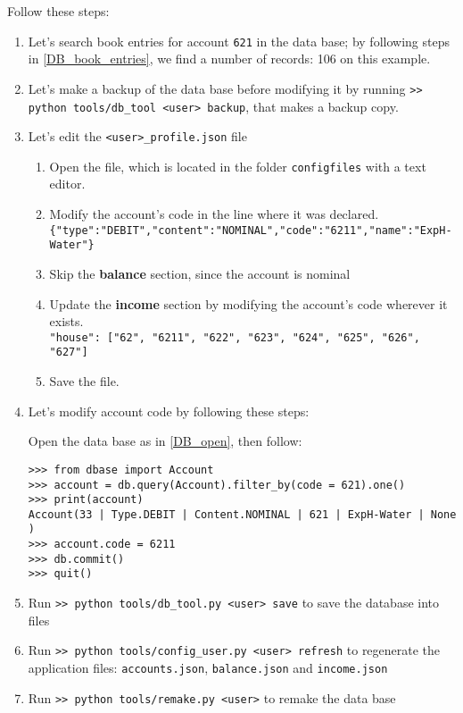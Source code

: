 \documentclass[12pt, a4paper]{article}
\begin{document}
Follow these steps:
\begin{enumerate}
\item Let's search book entries for account \verb!621! in the data base; by following steps in  \ref{DB_book_entries}, we find a number of records:  106 on this example. 
\item Let's make a backup of the data base before modifying it by running 
\verb!>> python tools/db_tool <user> backup!, that makes a backup copy.
\item Let's edit the \verb!<user>_profile.json! file
\begin{enumerate}
 \item Open the file, which is located in the folder \verb!configfiles! with a text editor.
 \item Modify the account's code in the line where it was declared. \\
 \verb!{"type":"DEBIT","content":"NOMINAL","code":"6211","name":"ExpH-Water"}!
 \item Skip the \textbf{balance} section, since the account is nominal
 \item Update the \textbf{income} section by modifying the account's code wherever it exists.\\
 \verb!"house": ["62", "6211", "622", "623", "624", "625", "626", "627"]!
 \item Save the file.
\end{enumerate}
\item Let's modify account code by following these steps:
 
Open the data base as in \ref{DB_open}, then follow:
\begin{verbatim}
>>> from dbase import Account
>>> account = db.query(Account).filter_by(code = 621).one()
>>> print(account)
Account(33 | Type.DEBIT | Content.NOMINAL | 621 | ExpH-Water | None )
>>> account.code = 6211
>>> db.commit()
>>> quit()
\end{verbatim}
\item Run \verb!>> python tools/db_tool.py <user> save! to save the database into files
\item Run \verb!>> python tools/config_user.py <user> refresh! to regenerate the application files: \verb!accounts.json!, \verb!balance.json! and \verb!income.json! 
\item Run \verb!>> python tools/remake.py <user>! to remake the data base
\end{enumerate}
\end{document}
